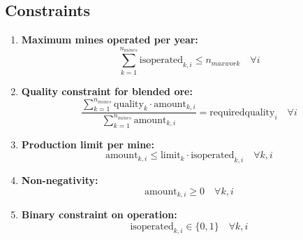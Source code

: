 \documentclass{article}
\begin{document}
\subsection*{Constraints}
\begin{enumerate}
    \item \textbf{Maximum mines operated per year:}
    \[
    \sum_{k=1}^{n_{mines}} \text{isoperated}_{k,i} \leq n_{maxwork} \quad \forall i
    \]
    
    \item \textbf{Quality constraint for blended ore:}
    \[
    \frac{\sum_{k=1}^{n_{mines}} \text{quality}_{k} \cdot \text{amount}_{k,i}}{\sum_{k=1}^{n_{mines}} \text{amount}_{k,i}} = \text{requiredquality}_{i} \quad \forall i
    \]
    
    \item \textbf{Production limit per mine:}
    \[
    \text{amount}_{k,i} \leq \text{limit}_{k} \cdot \text{isoperated}_{k,i} \quad \forall k, i
    \]
    
    \item \textbf{Non-negativity:}
    \[
    \text{amount}_{k,i} \geq 0 \quad \forall k, i
    \]
    
    \item \textbf{Binary constraint on operation:}
    \[
    \text{isoperated}_{k,i} \in \{0, 1\} \quad \forall k, i
    \]
\end{enumerate}
\end{document}
